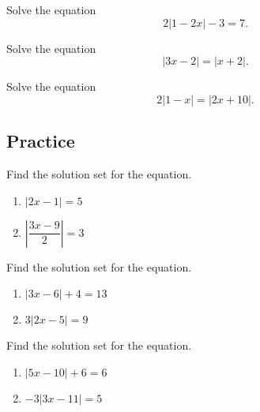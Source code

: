 \begin{example}

Solve the equation \[2|1-2x|-3=7.\]

\end{example}
\vspace*{5\baselineskip}

\begin{example}

Solve the equation \[|3x-2|=|x+2|.\]

\end{example}
\vspace*{5\baselineskip}

\begin{example}

Solve the equation \[2|1-x|=|2x+10|.\]

\end{example}
\vspace*{5\baselineskip}

\subsection{Practice}

\begin{exercise}

Find the solution set for the equation.

\begin{enumerate}
\item
  \(|2x-1| = 5\)
\item
  \(\left|\dfrac{3x-9}{2}\right|=3\)
\end{enumerate}

\end{exercise}

\begin{exercise}

Find the solution set for the equation.

\begin{enumerate}
\item
  \(|3x-6|+4=13\)
\item
  \(3|2x-5|=9\)
\end{enumerate}

\end{exercise}

\begin{exercise}

Find the solution set for the equation.

\begin{enumerate}
\item
  \(|5x-10|+6=6\)
\item
  \(-3|3x-11|=5\)
\end{enumerate}

\end{exercise}

